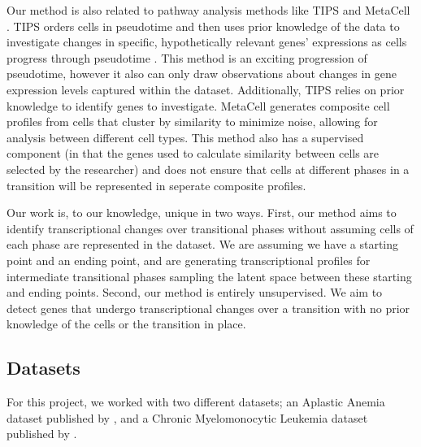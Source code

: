 \documentclass{article}
\begin{document}
Our method is also related to pathway analysis methods like TIPS \citep{zheng_tips_2021} and MetaCell \citep{baran_metacell_2019}.
TIPS orders cells in pseudotime and then uses prior knowledge of the data to investigate changes in specific, hypothetically relevant genes' expressions as cells progress through pseudotime \citep{zheng_tips_2021}.
This method is an exciting progression of pseudotime, however it also can only draw observations about changes in gene expression levels captured within the dataset.
Additionally, TIPS relies on prior knowledge to identify genes to investigate.
MetaCell generates composite cell profiles from cells that cluster by similarity to minimize noise, allowing for analysis between different cell types.
This method also has a supervised component (in that the genes used to calculate similarity between cells are selected by the researcher) and does not ensure that cells at different phases in a transition will be represented in seperate composite profiles.

Our work is, to our knowledge, unique in two ways.
First, our method aims to identify transcriptional changes over transitional phases without assuming cells of each phase are represented in the dataset.
We are assuming we have a starting point and an ending point, and are generating transcriptional profiles for intermediate transitional phases sampling the latent space between these starting and ending points.
Second, our method is entirely unsupervised.
We aim to detect genes that undergo transcriptional changes over a transition with no prior knowledge of the cells or the transition in place.

\subsection{Datasets}
For this project, we worked with two different datasets; an Aplastic Anemia dataset published by \citet{tonglin_single-cell_2022}, and a Chronic Myelomonocytic Leukemia dataset published by \citet{ferrall-fairbanks_progenitor_2022}.
\end{document}
